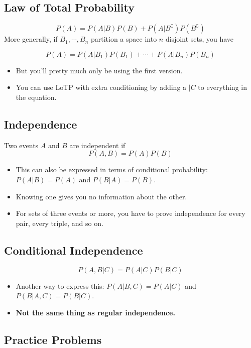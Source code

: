 \documentclass{article}
\begin{document}
\subsection{Law of Total Probability}

$$P(A) = P(A|B)P(B) + P(A|B^\complement)P(B^\complement)$$
More generally, if $B_1, \cdots, B_n$ partition a space into $n$ disjoint sets, you have 

$$P(A) = P(A|B_1)P(B_1) + \cdots + P(A|B_n)P(B_n)$$
\begin{itemize}
    \item But you'll pretty much only be using the first version.
    \item You can use LoTP with extra conditioning by adding a $|C$ to everything in the equation.
\end{itemize}

\subsection{Independence}

Two events $A$ and $B$ are independent if $$P(A, B) = P(A)P(B)$$

\begin{itemize}
    \item This can also be expressed in terms of conditional probability: $P(A|B) = P(A)$ and $P(B|A) = P(B)$.
    \item Knowing one gives you no information about the other.
    \item For sets of three events or more, you have to prove independence for every pair, every triple, and so on.
\end{itemize}

\subsection{Conditional Independence}

$$P(A, B|C) = P(A|C)P(B|C)$$
\begin{itemize}
    \item Another way to express this: $P(A|B, C) = P(A|C)$ and $P(B|A, C) = P(B|C)$.
    \item \textbf{Not the same thing as regular independence.}
\end{itemize}

\subsection{Practice Problems}
\end{document}
